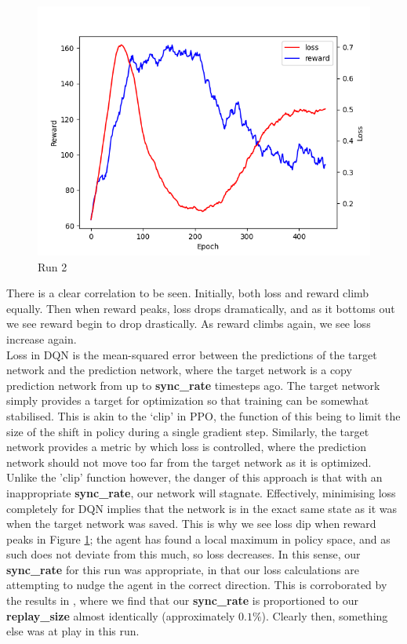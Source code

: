 \documentclass[12pt]{article}
\begin{document}
\begin{figure}[H] 
    \centering
    \includegraphics[scale=0.7]{18.png}
    \caption{Run 2}
    \label{lossreward}
\end{figure}
There is a clear correlation to be seen. Initially, both loss and reward climb equally. Then when reward peaks, loss drops dramatically, and as it bottoms out we see reward begin to drop drastically. As reward climbs again, we see loss increase again. \\\newline
Loss in DQN is the mean-squared error between the predictions of the target network and the prediction network, where the target network is a copy prediction network from up to \textbf{sync\_rate} timesteps ago. The target network simply provides a target for optimization so that training can be somewhat stabilised. This is akin to the `clip' in PPO, the function of this being to limit the size of the shift in policy during a single gradient step. Similarly, the target network provides a metric by which loss is controlled, where the prediction network should not move too far from the target network as it is optimized. Unlike the 'clip' function however, the danger of this approach is that with an inappropriate \textbf{sync\_rate}, our network will stagnate. Effectively, minimising loss completely for DQN implies that the network is in the exact same state as it was when the target network was saved. This is why we see loss dip when reward peaks in Figure \ref{lossreward}; the agent has found a local maximum in policy space, and as such does not deviate from this much, so loss decreases.
In this sense, our \textbf{sync\_rate} for this run was appropriate, in that our loss calculations are attempting to nudge the agent in the correct direction. This is corroborated by the results in \textcite{Mnih2015}, where we find that our \textbf{sync\_rate} is proportioned to our \textbf{replay\_size} almost identically (approximately $0.1\%$). Clearly then, something else was at play in this run. 
\end{document}
